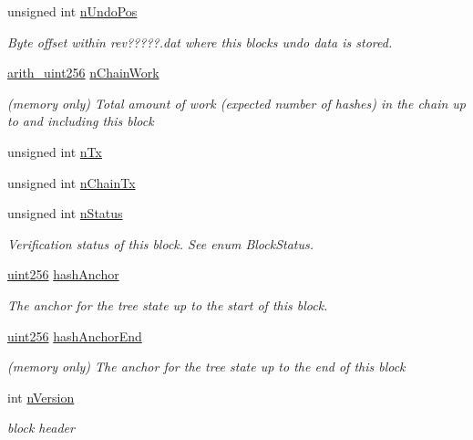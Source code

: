 \begin{DoxyCompactItemize}
unsigned int \mbox{\hyperlink{class_c_block_index_a865ddd56406c23e98cdc61511a61eb64}{n\+Undo\+Pos}}
\begin{DoxyCompactList}\small\item\em Byte offset within rev?????.dat where this block\textquotesingle{}s undo data is stored. \end{DoxyCompactList}\item 
\mbox{\hyperlink{classarith__uint256}{arith\+\_\+uint256}} \mbox{\hyperlink{class_c_block_index_a31e65c1f491d438dfdcd8d92bdfa73a1}{n\+Chain\+Work}}
\begin{DoxyCompactList}\small\item\em (memory only) Total amount of work (expected number of hashes) in the chain up to and including this block \end{DoxyCompactList}\item 
unsigned int \mbox{\hyperlink{class_c_block_index_ac8e219a377839d2f9133a4387f46e44e}{n\+Tx}}
\item 
unsigned int \mbox{\hyperlink{class_c_block_index_af3c6d6dd8a7579e5ce516d94b98d2db5}{n\+Chain\+Tx}}
\item 
unsigned int \mbox{\hyperlink{class_c_block_index_ac5a336b45ca70e3ed2fc090bf2ee3011}{n\+Status}}
\begin{DoxyCompactList}\small\item\em Verification status of this block. See enum Block\+Status. \end{DoxyCompactList}\item 
\mbox{\hyperlink{classuint256}{uint256}} \mbox{\hyperlink{class_c_block_index_a12e1a49faeb94cc8eedd7895a034540c}{hash\+Anchor}}
\begin{DoxyCompactList}\small\item\em The anchor for the tree state up to the start of this block. \end{DoxyCompactList}\item 
\mbox{\hyperlink{classuint256}{uint256}} \mbox{\hyperlink{class_c_block_index_ad1ad1271dbf7360a3a5ce219ad32ee1b}{hash\+Anchor\+End}}
\begin{DoxyCompactList}\small\item\em (memory only) The anchor for the tree state up to the end of this block \end{DoxyCompactList}\item 
int \mbox{\hyperlink{class_c_block_index_a45126301a0a6e26010527a7bbfc1ef58}{n\+Version}}
\begin{DoxyCompactList}\small\item\em block header \end{DoxyCompactList}\item 

\end{DoxyCompactItemize}
